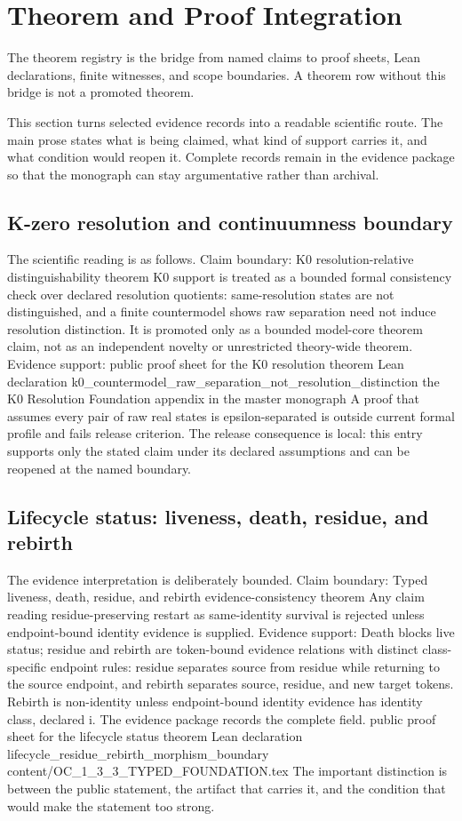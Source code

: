 \section{Theorem and Proof Integration}
The theorem registry is the bridge from named claims to proof sheets, Lean declarations, finite witnesses, and scope boundaries. A theorem row without this bridge is not a promoted theorem.

This section turns selected evidence records into a readable scientific route. The main prose states what is being claimed, what kind of support carries it, and what condition would reopen it. Complete records remain in the evidence package so that the monograph can stay argumentative rather than archival.

\subsection{K-zero resolution and continuumness boundary}
The scientific reading is as follows. Claim boundary: K0 resolution-relative distinguishability theorem K0 support is treated as a bounded formal consistency check over declared resolution quotients: same-resolution states are not distinguished, and a finite countermodel shows raw separation need not induce resolution distinction. It is promoted only as a bounded model-core theorem claim, not as an independent novelty or unrestricted theory-wide theorem. Evidence support: public proof sheet for the K0 resolution theorem Lean declaration k0\_countermodel\_raw\_separation\_not\_resolution\_distinction the K0 Resolution Foundation appendix in the master monograph A proof that assumes every pair of raw real states is epsilon-separated is outside current formal profile and fails release criterion. The release consequence is local: this entry supports only the stated claim under its declared assumptions and can be reopened at the named boundary.

\subsection{Lifecycle status: liveness, death, residue, and rebirth}
The evidence interpretation is deliberately bounded. Claim boundary: Typed liveness, death, residue, and rebirth evidence-consistency theorem Any claim reading residue-preserving restart as same-identity survival is rejected unless endpoint-bound identity evidence is supplied. Evidence support: Death blocks live status; residue and rebirth are token-bound evidence relations with distinct class-specific endpoint rules: residue separates source from residue while returning to the source endpoint, and rebirth separates source, residue, and new target tokens. Rebirth is non-identity unless endpoint-bound identity evidence has identity class, declared i. The evidence package records the complete field. public proof sheet for the lifecycle status theorem Lean declaration lifecycle\_residue\_rebirth\_morphism\_boundary content/OC\_1\_3\_3\_TYPED\_FOUNDATION.tex The important distinction is between the public statement, the artifact that carries it, and the condition that would make the statement too strong.

